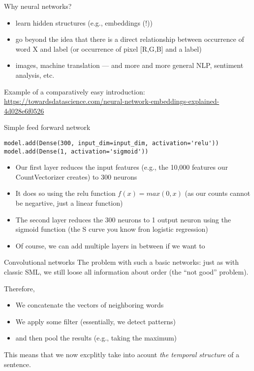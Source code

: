 \documentclass[compress]{beamer}
\begin{document}
\begin{frame}{Why neural networks?}
	\begin{itemize}
		\item learn hidden structures (e.g., embeddings (!))
		\item go beyond the idea that there is a direct relationship between occurrence of word X and label (or occurrence of pixel [R,G,B] and a label)
		\item images, machine translation --- and more and more general NLP, sentiment analysis, etc.
	\end{itemize}
	
	\small {Example of a comparatively easy introduction:
		\url{https://towardsdatascience.com/neural-network-embeddings-explained-4d028e6f0526}}
	
\end{frame}


\begin{frame}[fragile]{Simple feed forward network}
	\begin{lstlisting}
model.add(Dense(300, input_dim=input_dim, activation='relu'))
model.add(Dense(1, activation='sigmoid'))
	\end{lstlisting}	
	
	\begin{itemize}[<+->]
		\item Our first layer reduces the input features (e.g., the 10,000 features our CountVectorizer creates) to 300 neurons
		\item It does so using the relu function $f(x) = max(0, x)$ (as our counts cannot be negartive, just a linear function)
		\item The second layer reduces the 300 neurons to 1 output neuron using the sigmoid function (the S curve you know fron logistic regression)
		\item Of course, we can add multiple layers in between if we want to
	\end{itemize}
\end{frame}



\begin{frame}{Convolutional networks}
	The problem with such a basic networks: just as with classic SML, we still loose all information about order (the ``not good'' problem).
	
	Therefore,
	\begin{itemize}
		\item We concatenate the vectors of neighboring words
		\item We apply some filter (essentially, we detect patterns)
		\item and then pool the results (e.g., taking the maximum)
	\end{itemize}
	This means that we now excplitly take into acount \emph{the temporal structure} of a sentence.
\end{frame}
\end{document}
